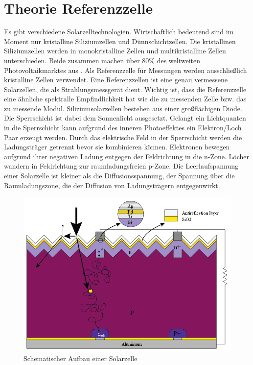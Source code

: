 \documentclass[a4paper,bibtotoc,oneside]{scrbook}
\begin{document}
\section{Theorie Referenzzelle}\thispagestyle{empty}
Es gibt verschiedene Solarzelltechnologien. Wirtschaftlich bedeutend sind im Moment nur kristalline Siliziumzellen und Dünnschichtzellen. Die kristallinen Siliziumzellen werden in monokristalline Zellen und multikristalline Zellen unterschieden. Beide zusammen machen über 80\% des weltweiten Photovoltaikmarktes aus \cite{iea00}. Als Referenzzelle für Messungen werden ausschließlich kristalline Zellen verwendet. Eine Referenzzellen ist eine genau vermessene Solarzellen, die als Strahlungsmessgerät dient. Wichtig ist, dass die Referenzzelle eine ähnliche spektralle Empfindlichkeit hat wie die zu messenden Zelle bzw. das zu messende Modul.
Siliziumsolarzellen bestehen aus einer großflächigen Diode. Die Sperrschicht ist dabei dem Sonnenlicht ausgesetzt. Gelangt ein Lichtquanten in die Sperrschicht kann aufgrund des inneren Photoeffektes ein Elektron/Loch Paar erzeugt werden. Durch das elektrische Feld in der Sperrschicht werden die Ladungsträger getrennt bevor sie kombinieren können. Elektronen bewegen aufgrund ihrer negativen Ladung entgegen der Feldrichtung in die n-Zone. Löcher wandern in Feldrichtung zur raumladungsfreien p-Zone. Die Leerlaufspannung einer Solarzelle ist kleiner als die Diffusionsspannung, der Spannung über die Raumladungszone, die der Diffusion von Ladungsträgern entgegenwirkt.
\begin{figure}[htbp]
\centering
\includegraphics[width=125mm]{img/cell.png}
\caption{Schematischer Aufbau einer Solarzelle}\label{cell}
\end{figure}
\end{document}
